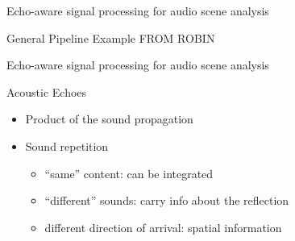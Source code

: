\begin{frame}[t]{Echo-aware \alert{signal processing} for audio scene analysis}

    \begin{block}{General Pipeline Example}
        FROM ROBIN
    \end{block}

\end{frame}

\begin{frame}{\alert{Echo-aware} signal processing for audio scene analysis}

    \begin{mydefblock}{Acoustic Echoes}
        \begin{itemize}
            \item Product of the sound propagation
            \item Sound repetition
            \begin{itemize}
                \item ``same'' content: can be integrated
                \item ``different'' sounds: carry info about the reflection
                \item different direction of arrival: spatial information
            \end{itemize}
        \end{itemize}
    \end{mydefblock}


\end{frame}
